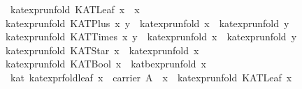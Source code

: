 \begin{isabellebody}
\ \ {}kat{}expr{}unfold\ {}KATLeaf\ x{}\ {}\ x{}\isanewline
{}\ {}kat{}expr{}unfold\ {}KATPlus\ x\ y{}\ {}\ kat{}expr{}unfold\ x\ {}\ kat{}expr{}unfold\ y{}\isanewline
{}\ {}kat{}expr{}unfold\ {}KATTimes\ x\ y{}\ {}\ kat{}expr{}unfold\ x\ {}\ kat{}expr{}unfold\ y{}\isanewline
{}\ {}kat{}expr{}unfold\ {}KATStar\ x{}\ {}\ {}kat{}expr{}unfold\ x{}\isanewline
{}\ {}kat{}expr{}unfold\ {}KATBool\ x{}\ {}\ kat{}bexpr{}unfold\ x{}\isanewline
\isanewline
{}\isamarkupfalse%
\ {}\ kat{}\ kat{}expr{}fold{}leaf{}\ {}x\ {}\ carrier\ A\ {}\ x\ {}\ kat{}expr{}unfold\ {}KATLeaf\ x{}{}\isanewline

\end{isabellebody}
